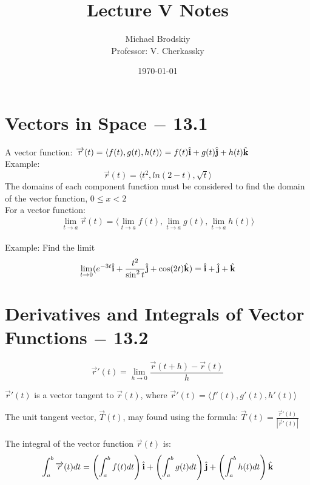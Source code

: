 \documentclass[12pt]{article}
\title{Lecture V Notes}
\date{\today}
\author{Michael Brodskiy\\ \small Professor: V. Cherkassky}
\begin{document}
\maketitle

\section{Vectors in Space $-$ 13.1}

A vector function: $\overrightarrow{r}(t) = \langle f(t), g(t), h(t) \rangle = f(t)\hat{\bold{i}} + g(t)\hat{\bold{j}} + h(t)\hat{\bold{k}}$\\

Example: $$\overrightarrow{r}(t)=\langle t^2, ln(2-t), \sqrt{t} \rangle$$
The domains of each component function must be considered to find the domain of the vector function, $0\leq x < 2$\\

For a vector function: $$\lim_{t\to a} \overrightarrow{r}(t)=\langle \lim_{t\to a} f(t), \lim_{t\to a} g(t), \lim_{t\to a} h(t) \rangle$$\\

Example: Find the limit
$$\lim_{t\to 0} (e^{-3t}\hat{\bold{i}} + \frac{t^2}{\sin^2{t}}\hat{\bold{j}} + \cos(2t)\hat{\bold{k}})=\hat{\bold{i}}+\hat{\bold{j}}+\hat{\bold{k}}$$

\section{Derivatives and Integrals of Vector Functions $-$ 13.2}

$$\overrightarrow{r}'(t)=\lim_{h\to 0} \frac{\overrightarrow{r}(t+h)-\overrightarrow{r}(t)}{h}$$

$\overrightarrow{r}'(t)$ is a vector tangent to $\overrightarrow{r}(t)$, where $\overrightarrow{r}'(t)=\langle f'(t), g'(t), h'(t) \rangle$

The unit tangent vector, $\overrightarrow{T}(t)$, may found using the formula: $\overrightarrow{T}(t)=\frac{\overrightarrow{r}'(t)}{|\overrightarrow{r}'(t)|}$

The integral of the vector function $\overrightarrow{r}(t)$ is: $$\int_{a}^{b} \overrightarrow{r}(t) dt = \left(\int_{a}^{b} f(t) dt\right)\hat{\bold{i}} + \left(\int_{a}^{b} g(t) dt\right)\hat{\bold{j}} + \left(\int_{a}^{b} h(t) dt\right)\hat{\bold{k}}$$
\end{document}
